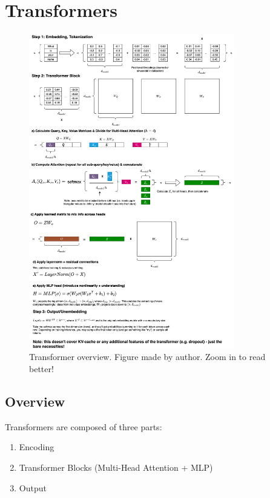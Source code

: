 \documentclass[12pt]{article}
\begin{document}
\section{Transformers}

\begin{figure}[H]
    \centering
    \includegraphics[width=0.8\textwidth]{../media/transformer.png}
    \caption{Transformer overview. Figure made by author. Zoom in to read better!}
    \label{fig:transformer}
\end{figure}

\subsection{Overview}

Transformers are composed of three parts:
\begin{enumerate}
  \item Encoding
  \item Transformer Blocks (Multi-Head Attention + MLP)
  \item Output
\end{enumerate}
\end{document}
